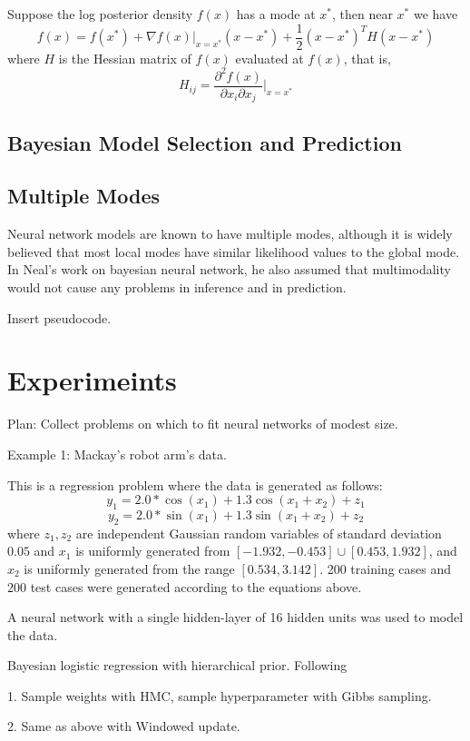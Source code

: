 \documentclass[]{report}
\begin{document}
\begin{enumerate}
Suppose the log posterior density $f(x)$ has a mode at $x^*$, then near $x^*$ we
have 
\[ f(x) = f(x^*) + \nabla f(x)|_{x=x^*} (x-x^*) + \frac{1}{2} (x-x^*)^TH(x-x^*)
\]
where $H$ is the Hessian matrix of $f(x)$ evaluated at $f(x)$, that is,
\[ H_{ij} = \frac{\partial^2 f(x)}{\partial x_i \partial x_j }|_{x=x^*} \]




\section{Bayesian Model Selection and Prediction}


\section{Multiple Modes}

Neural network models are known to have multiple modes, although it is widely believed that most local modes have similar likelihood values to the global mode. In Neal's work on bayesian neural network, he also assumed that multimodality would not cause any problems in inference and in prediction. 


Insert pseudocode. 
\chapter{Experimeints}
Plan:
Collect problems on which to fit neural networks of modest size. 

Example 1: Mackay's robot arm's data. 

This is a regression problem where the data is generated as follows:
\[ y_1 = 2.0 * \cos(x_1) + 1.3 \cos(x_1+x_2) + z_1 \]
\[ y_2 = 2.0 * \sin(x_1) + 1.3 \sin(x_1+x_2) + z_2 \]
where $z_1,z_2$ are independent Gaussian random variables of standard deviation
$0.05$ and $x_1$ is uniformly generated from $[-1.932,-0.453]\cup
[0.453,1.932]$, and $x_2$ is uniformly generated from the range $[0.534,3.142]$.
200 training cases and 200 test cases were generated according to the equations
above. 

A neural network with a single hidden-layer of 16 hidden units was used to model
the data.

Bayesian logistic regression with hierarchical prior. Following \cite{zhang2014semi}

1. Sample weights with HMC, sample hyperparameter with Gibbs sampling.

2. Same as above with Windowed update.


\end{enumerate}
\end{document}
